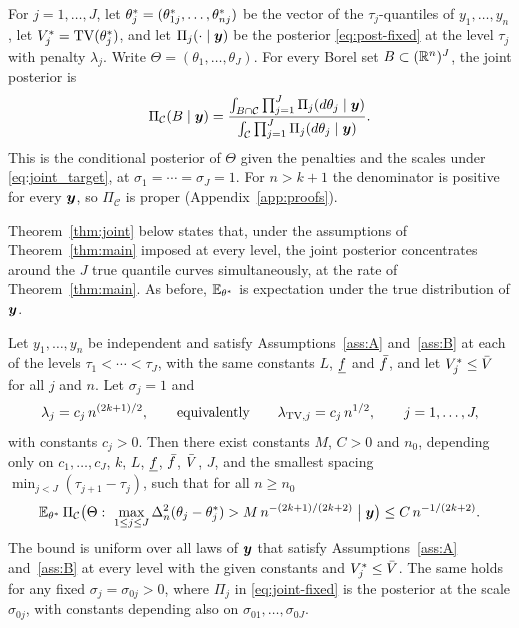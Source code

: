 For $j=1,\dots,J$, let $\theta^{*}_j=(\theta^{*}_{1j},\dots,\theta^{*}_{nj})$ be the vector of the $\tau_j$-quantiles of $y_1,\dots,y_n$, let $V^{*}_j=\mathrm{TV}(\theta^{*}_j)$, and let $\Pi_j(\cdot\mid\bm{y})$ be the posterior \eqref{eq:post-fixed} at the level $\tau_j$ with penalty $\lambda_j$. Write $\Theta=(\theta_1,\dots,\theta_J)$. For every Borel set $B\subset(\mathbb{R}^n)^J$, the joint posterior is
\begin{equation}\label{eq:joint-fixed}
\Pi_{\mathcal C}(B\mid\bm{y})=\frac{\int_{B\cap\mathcal C}\prod_{j=1}^J\Pi_j(d\theta_j\mid\bm{y})}{\int_{\mathcal C}\prod_{j=1}^J\Pi_j(d\theta_j\mid\bm{y})} .
\end{equation}
This is the conditional posterior of $\Theta$ given the penalties and the scales under \eqref{eq:joint_target}, at $\sigma_1=\cdots=\sigma_J=1$. For $n>k+1$ the denominator is positive for every $\bm{y}$, so $\Pi_{\mathcal C}$ is proper (Appendix~\ref{app:proofs}).

Theorem~\ref{thm:joint} below states that, under the assumptions of Theorem~\ref{thm:main} imposed at every level, the joint posterior concentrates around the $J$ true quantile curves simultaneously, at the rate of Theorem~\ref{thm:main}. As before, $\mathbb{E}_{\theta^{*}}$ is expectation under the true distribution of $\bm{y}$.

\begin{theorem}\label{thm:joint}
Let $y_1,\dots,y_n$ be independent and satisfy Assumptions~\ref{ass:A} and~\ref{ass:B} at each of the levels $\tau_1<\cdots<\tau_J$, with the same constants $L$, $\underline f$ and $\bar f$, and let $V^{*}_j\le\bar V$ for all $j$ and $n$. Let $\sigma_j=1$ and
\[
\lambda_j=c_j\,n^{(2k+1)/2},\qquad\text{equivalently}\qquad\lambda_{\mathrm{TV},j}=c_j\,n^{1/2},\qquad j=1,\dots,J,
\]
with constants $c_j>0$. Then there exist constants $M$, $C>0$ and $n_0$, depending only on $c_1,\dots,c_J$, $k$, $L$, $\underline f$, $\bar f$, $\bar V$, $J$, and the smallest spacing $\min_{j<J}(\tau_{j+1}-\tau_j)$, such that for all $n\ge n_0$
\[
\mathbb{E}_{\theta^{*}}\,\Pi_{\mathcal C}\bigl(\Theta:\ \max_{1\le j\le J}\Delta_n^2(\theta_j-\theta^{*}_j)>M\,n^{-(2k+1)/(2k+2)}\bigm|\bm{y}\bigr)\le C\,n^{-1/(2k+2)}.
\]
The bound is uniform over all laws of $\bm{y}$ that satisfy Assumptions~\ref{ass:A} and~\ref{ass:B} at every level with the given constants and $V^{*}_j\le\bar V$. The same holds for any fixed $\sigma_j=\sigma_{0j}>0$, where $\Pi_j$ in \eqref{eq:joint-fixed} is the posterior at the scale $\sigma_{0j}$, with constants depending also on $\sigma_{01},\dots,\sigma_{0J}$.
\end{theorem}

